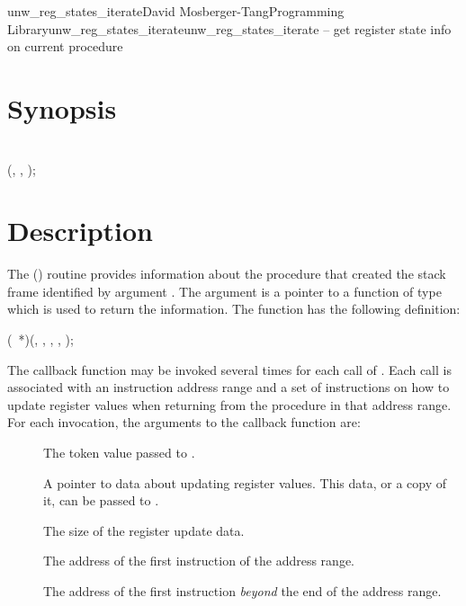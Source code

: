 \documentclass{article}
\begin{document}
\begin{Name}{3}{unw\_reg\_states\_iterate}{David Mosberger-Tang}{Programming Library}{unw\_reg\_states\_iterate}unw\_reg\_states\_iterate -- get register state info on current procedure
\end{Name}

\section{Synopsis}

\\

 (, , );\\

\section{Description}

The () routine provides
information about the procedure that created the stack frame
identified by argument .  The  argument is a pointer
to a function of type  which is used to
return the information.  The function  has the
following definition:

 (~*)(,
			,
			 ,
			 ,  );

The callback function may be invoked several times for each call of . Each call is associated with an instruction address range and a set of instructions on how to update register values when returning from the procedure in that address range.  For each invocation, the arguments to the callback function are:
\begin{description}
\item[ ] The token value passed to . \\
\item[ ] A pointer to data about
  updating register values. This data, or a copy of it, can be passed
  to .\\
\item[ ] The size of the register update data. \\
\item[ ] The address of the first
  instruction of the address range.  \\
\item[ ] The address of the first
  instruction \emph{beyond} the end of the address range.  \\
\end{description}
\end{document}
